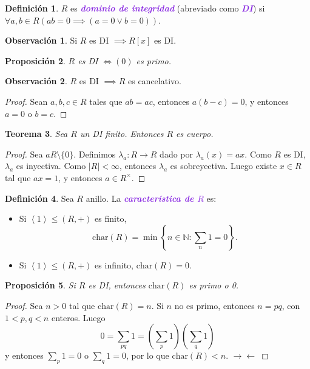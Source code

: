 \documentclass{article}
\newtheorem{theorem}{Teorema}[subsection]
\newtheorem{proposition}[theorem]{Proposición}
\theoremstyle{definition}
\newtheorem{definition}[theorem]{Definición}
\newtheorem*{obs}{Observación}
\theoremstyle{remark}
\numberwithin{equation}{section}
\newcommand{\N}{\mathbb{N}}
\newcommand{\lam}{\lambda}
\newcommand{\oo}{\infty}
\newcommand{\Char}{\mathrm{char}}
\newcommand{\abs}[1]{\left| #1 \right|}
\newcommand{\br}[1]{\left( #1 \right)}
\newcommand{\set}[1]{\left\{ #1 \right\}}
\newcommand{\gen}[1]{\left\langle #1 \right\rangle}
\newcommand{\wea}[1]{\textcolor{BlueViolet}{\textbf{\emph{#1}}}}
\begin{document}
\begin{definition}
  $R$ es \wea{dominio de integridad} (abreviado como \wea{DI}) si $\forall a,b \in R (ab = 0 \implies (a=0 \lor b=0))$.
\end{definition}

\begin{obs}
  Si $R$ es DI $\implies R[x]$ es DI.
\end{obs}

\begin{proposition}
  $R$ es DI $\iff (0)$ es primo.
\end{proposition}

\begin{obs}
  $R$ es DI $\implies R$ es cancelativo.
\end{obs}
\begin{proof}
  Sean $a,b,c \in R$ tales que $ab = ac$, entonces $a(b-c) = 0$, y entonces $a=0$ o $b=c$.
\end{proof}

\begin{theorem}
  Sea $R$ un DI finito. Entonces $R$ es cuerpo.
\end{theorem}
\begin{proof}
  Sea $a R \setminus \{0\}$. Definimos $\lam_a \colon R \to R$ dado por $\lam_a(x) = ax$.
  Como $R$ es DI, $\lam_a$ es inyectiva. Como $\abs R < \oo$, entonces $\lam_a$ es sobreyectiva. Luego existe $x \in R$ tal que $ax = 1$, y entonces $a \in R^\times$.
\end{proof}

\begin{definition}
  Sea $R$ anillo. La \wea{característica de $R$} es:
  \begin{itemize}
    \item Si $\gen{1} \leqslant (R,+)$ es finito, 
    \[ \Char(R) = \min\set{n \in \N \colon \sum_n 1 = 0}. \]
    \item Si $\gen{1} \leqslant (R,+)$ es infinito, $\Char(R) = 0$.
  \end{itemize}
\end{definition}

\begin{proposition}
  Si $R$ es DI, entonces $\Char(R)$ es primo o 0.
\end{proposition}
\begin{proof}
  Sea $n > 0$ tal que $\Char(R) = n$. Si $n$ no es primo, entonces $n = pq$, con $1 < p,q < n$ enteros. Luego 
  \[ 0 = \sum_{pq} 1 = \br{\sum_p 1} \br{\sum_q 1} \]
  y entonces $\sum_p 1 = 0$ o $\sum_q 1 = 0$, por lo que $\Char(R) < n$. \(\to\gets\)
\end{proof}
\end{document}
